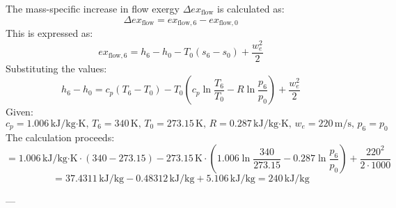 The mass-specific increase in flow exergy \( \Delta ex_{\text{flow}} \) is calculated as:  
\[
\Delta ex_{\text{flow}} = ex_{\text{flow},6} - ex_{\text{flow},0}
\]  
This is expressed as:  
\[
ex_{\text{flow},6} = h_6 - h_0 - T_0 (s_6 - s_0) + \frac{w_e^2}{2}
\]  
Substituting the values:  
\[
h_6 - h_0 = c_p (T_6 - T_0) - T_0 \left( c_p \ln \frac{T_6}{T_0} - R \ln \frac{p_6}{p_0} \right) + \frac{w_e^2}{2}
\]  
Given:  
\[
c_p = 1.006 \, \text{kJ/kg·K}, \, T_6 = 340 \, \text{K}, \, T_0 = 273.15 \, \text{K}, \, R = 0.287 \, \text{kJ/kg·K}, \, w_e = 220 \, \text{m/s}, \, p_6 = p_0
\]  
The calculation proceeds:  
\[
= 1.006 \, \text{kJ/kg·K} \cdot (340 - 273.15) - 273.15 \, \text{K} \cdot \left( 1.006 \ln \frac{340}{273.15} - 0.287 \ln \frac{p_6}{p_0} \right) + \frac{220^2}{2 \cdot 1000}
\]  
\[
= 37.4311 \, \text{kJ/kg} - 0.48312 \, \text{kJ/kg} + 5.106 \, \text{kJ/kg} = 240 \, \text{kJ/kg}
\]  

---
